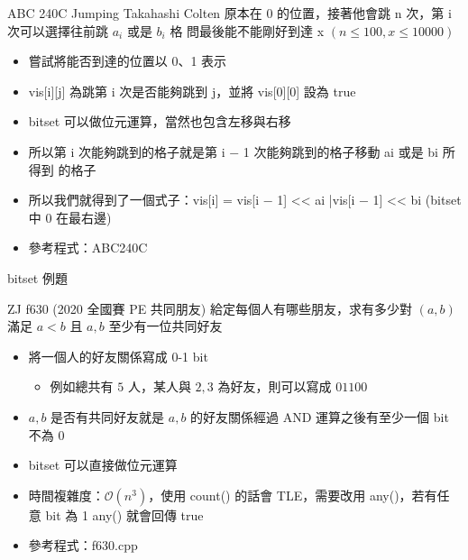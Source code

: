 \documentclass[aspectratio=169]{beamer}
\begin{document}
    \begin{frame}
        \begin{block}{ABC 240C Jumping Takahashi}
            Colten 原本在 0 的位置，接著他會跳 n 次，第 i 次可以選擇往前跳 $a_i$ 或是 $b_i$ 格
問最後能不能剛好到達 x $(n \le 100, x \le 10000)$
        \end{block}

        \begin{itemize}
            \item<2-> 嘗試將能否到達的位置以 0、1 表示 
            \item<3-> vis[i][j] 為跳第 i 次是否能夠跳到 j，並將 vis[0][0] 設為 true
            \item<4-> bitset 可以做位元運算，當然也包含左移與右移
            \item<5-> 所以第 i 次能夠跳到的格子就是第 i − 1 次能夠跳到的格子移動 ai 或是 bi 所得到
            的格子
            \item<6-> 所以我們就得到了一個式子：vis[i] = vis[i − 1] << ai
            |vis[i − 1] << bi (bitset 中 0 在最右邊)
            \item<6-> 參考程式：ABC240C
        \end{itemize}
    \end{frame}

    \begin{frame}{bitset 例題}
        \begin{block}{ZJ f630 (2020 全國賽 PE 共同朋友)}
            給定每個人有哪些朋友，求有多少對 $(a, b)$ 滿足 $a<b$ 且 $a, b$ 至少有一位共同好友
        \end{block}

        \begin{itemize}
            \item<2-> 將一個人的好友關係寫成 0-1 bit
            \begin{itemize}
                \item<3-> 例如總共有 $5$ 人，某人與 ${2, 3}$ 為好友，則可以寫成 $01100$
            \end{itemize}
            \item<4-> $a, b$ 是否有共同好友就是 $a, b$ 的好友關係經過 AND 運算之後有至少一個 bit 不為 0
            \item<5-> bitset 可以直接做位元運算
            \item<6-> 時間複雜度：$\mathcal{O}(n^3)$，使用 count() 的話會 TLE，需要改用 any()，若有任意 bit 為 1 any() 就會回傳 true
            \item<6-> 參考程式：f630.cpp
        \end{itemize}
    \end{frame}
\end{document}
